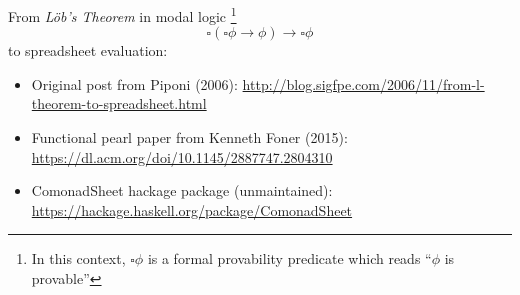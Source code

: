 \documentclass[10pt]{beamer}
\begin{document}
\begin{frame}[fragile]
  From \emph{L\"ob's Theorem} in modal logic%
  \footnote{In this context, $\square \phi$ is a formal provability predicate which reads ``$\phi$ is provable''}
  \begin{equation}
    \square \left( \square \phi \rightarrow \phi \right) \rightarrow \square \phi 
  \end{equation}
  to spreadsheet evaluation:
  \begin{itemize}
    \item Original post from Piponi (2006): \url{http://blog.sigfpe.com/2006/11/from-l-theorem-to-spreadsheet.html}
    \item Functional pearl paper from Kenneth Foner (2015): \url{https://dl.acm.org/doi/10.1145/2887747.2804310}
    \item ComonadSheet hackage package (unmaintained): \url{https://hackage.haskell.org/package/ComonadSheet}
  \end{itemize}
\end{frame}


% 
% 
\end{document}
